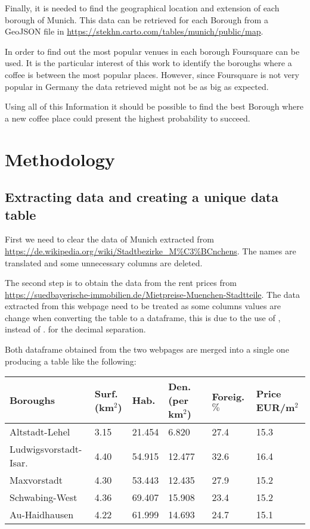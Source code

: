 \documentclass[]{report}
\begin{document}
Finally, it is needed to find the geographical location and extension of each borough of Munich. This data can be retrieved for each Borough from a GeoJSON file in \url{https://stekhn.carto.com/tables/munich/public/map}.

In order to find out the most popular venues in each borough Foursquare can be used. It is the particular interest of this work to identify the boroughs where a coffee is between the most popular places. However, since Foursquare is not very popular in Germany the data retrieved might not be as big as expected.

Using all of this Information it should be possible to find the best Borough where a new coffee place could present the highest probability to succeed.

\section*{Methodology}

\subsection*{Extracting data and creating a unique data table}

First we need to clear the data of Munich extracted from \url{https://de.wikipedia.org/wiki/Stadtbezirke_M\%C3\%BCnchens}. The names are translated and some unnecessary columns are deleted.
	
The second step is to obtain the data from the rent prices from	\url{https://suedbayerische-immobilien.de/Mietpreise-Muenchen-Stadtteile}. The data extracted from this webpage need to be treated as some columns values are change when converting the table to a dataframe, this is due to the  use of , instead of . for the decimal separation.
	

Both dataframe obtained from the two webpages are merged into a single one producing a table like the following:	
 \begin{center}
 	\begin{tabular}{ | l | l | l | l | l | l |}
 		\hline
 		
 		\textbf{Boroughs} & \textbf{Surf.}(km$^2$) & \textbf{Hab.} & \textbf{Den.}(per km$^2$)& \textbf{Foreig.} $\%$ & \textbf{Price} EUR/m$^2$ \\ \hline
 		Altstadt-Lehel   &3.15 & 21.454 &  6.820 & 27.4& 15.3 \\ \hline
 		Ludwigsvorstadt-Isar. &4.40 & 54.915 & 12.477  & 32.6& 16.4 \\ \hline    
 		Maxvorstadt     &4.30 & 53.443 &12.435     &     27.9& 15.2  \\ \hline
 		Schwabing-West  &4.36 & 69.407&  15.908     &     23.4& 15.2  \\ \hline
 		Au-Haidhausen   &4.22 & 61.999&  14.693     &     24.7& 15.1 \\ \hline
 		\hline
 	\end{tabular}
\end{center}	
 	\vspace{0.5cm}	
\end{document}

